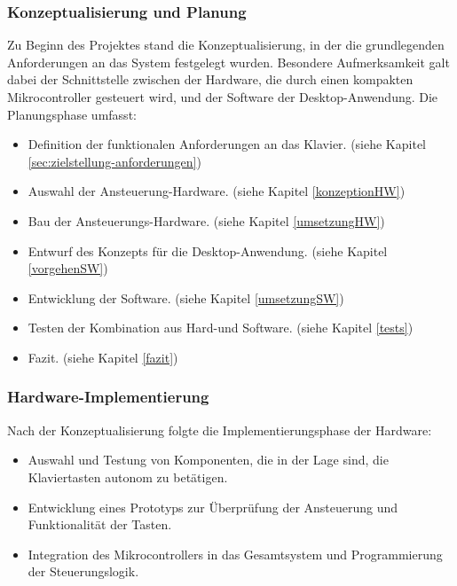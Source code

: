 \subsubsection{Konzeptualisierung und Planung}\label{Vorgehensweise - Konzeptualisierung und Planung}

Zu Beginn des Projektes stand die Konzeptualisierung, in der die grundlegenden Anforderungen an das System festgelegt wurden.
Besondere Aufmerksamkeit galt dabei der Schnittstelle zwischen der Hardware, die durch einen kompakten Mikrocontroller gesteuert wird, und der Software der Desktop-Anwendung.
Die Planungsphase umfasst: %

\begin{itemize}
    \item Definition der funktionalen Anforderungen an das Klavier. (siehe Kapitel \ref{sec:zielstellung-anforderungen})
    \item Auswahl der Ansteuerung-Hardware. (siehe Kapitel \ref{konzeptionHW})
    \item Bau der Ansteuerungs-Hardware. (siehe Kapitel \ref{umsetzungHW})
    \item Entwurf des Konzepts für die Desktop-Anwendung. (siehe Kapitel \ref{vorgehenSW})
    \item Entwicklung der Software. (siehe Kapitel \ref{umsetzungSW})
    \item Testen der Kombination aus Hard-und Software. (siehe Kapitel \ref{tests})
    \item Fazit. (siehe Kapitel \ref{fazit})
\end{itemize}

\subsubsection{Hardware-Implementierung}\label{Vorgehensweise - Hardware-Implementierung}

Nach der Konzeptualisierung folgte die Implementierungsphase der Hardware:

\begin{itemize}
    \item Auswahl und Testung von Komponenten, die in der Lage sind, die Klaviertasten autonom zu betätigen.
    \item Entwicklung eines Prototyps zur Überprüfung der Ansteuerung und Funktionalität der Tasten.
    \item Integration des Mikrocontrollers in das Gesamtsystem und Programmierung der Steuerungslogik.
\end{itemize}

